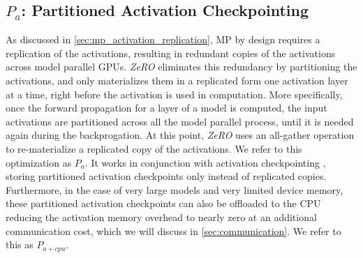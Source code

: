 \documentclass{article}
\newcommand{\name}{\emph{ZeRO}\xspace}
\begin{document}
\subsection{$P_a$: Partitioned Activation Checkpointing}
\label{sec:p_a}
As discussed in \ref{sec:mp_activation_replication}, MP by design requires a replication of the activations, resulting in redundant copies of the activations across model parallel GPUs. \name eliminates this redundancy by partitioning the activations, and only materializes them in a replicated form one activation layer at a time, right before the activation is used in computation. More specifically, once the forward propagation for a layer of a model is computed, the input activations are partitioned across all the model parallel process, until it is needed again during the backprogation. At this point, \name uses an all-gather operation to re-materialize a replicated copy of the activations. We refer to this optimization as $P_a$. It works in conjunction with activation checkpointing \cite{DBLP:journals/corr/ChenXZG16}, storing partitioned activation checkpoints only instead of replicated copies. Furthermore, in the case of very large models and very limited device memory, these partitioned activation checkpoints can also be offloaded to the CPU reducing the activation memory overhead to nearly zero at an additional communication cost, which we will discuss in \ref{sec:communication}. We refer to this as $P_{a+cpu}$. 
\end{document}
